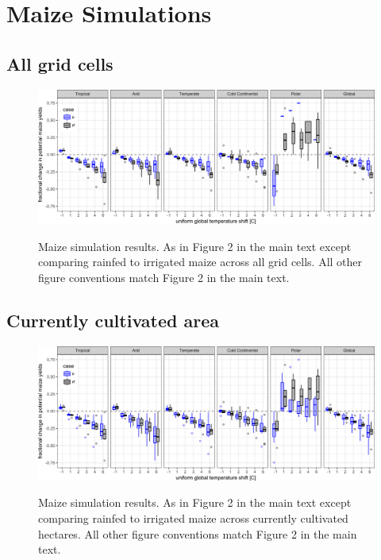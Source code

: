 \documentclass[10pt]{article}
\begin{document}
\clearpage
\section{Maize Simulations}
\subsection{All grid cells}
\begin{figure}[h!]
\includegraphics[width=\textwidth]{s_maize_sim_CG.png}\\
\caption{Maize simulation results. As in Figure 2 in the main text except comparing rainfed to irrigated maize across all grid cells. All other figure conventions match Figure 2 in the main text.}
\label{fig:maizeCG}
\end{figure}

\subsection{Currently cultivated area}
\begin{figure}[h!]
\includegraphics[width=\textwidth]{s_maize_sim_CG_area_weight.png}\\
\caption{Maize simulation results. As in Figure 2 in the main text except comparing rainfed to irrigated maize across currently cultivated hectares. All other figure conventions match Figure 2 in the main text.}
\label{fig:maizeCG}
\end{figure}
\end{document}
